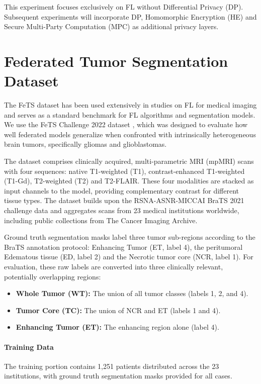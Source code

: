 \documentclass{article}
\begin{document}
This experiment focuses exclusively on FL without Differential Privacy (DP). Subsequent experiments will incorporate DP, Homomorphic Encryption (HE) and Secure Multi-Party Computation (MPC) as additional privacy layers.

\section{Federated Tumor Segmentation Dataset}
The FeTS dataset \cite{pati_federated_2025} has been used extensively in studies on FL for medical imaging \cite{reina_openfl_2022, khan_adaptive_2022, luo_influence_2023, nalawade_federated_2022} and serves as a standard benchmark for FL algorithms and segmentation models. We use the FeTS Challenge 2022 dataset \cite{spyridon_bakas_2022_6622476}, which was designed to evaluate how well federated models generalize when confronted with intrinsically heterogeneous brain tumors, specifically gliomas and glioblastomas.

The dataset comprises clinically acquired, multi-parametric MRI (mpMRI) scans with four sequences: native T1-weighted (T1), contrast-enhanced T1-weighted (T1-Gd), T2-weighted (T2) and T2-FLAIR. These four modalities are stacked as input channels to the model, providing complementary contrast for different tissue types. The dataset builds upon the RSNA-ASNR-MICCAI BraTS 2021 challenge data \cite{baid2023brats2021dataset} and aggregates scans from 23 medical institutions worldwide, including public collections from The Cancer Imaging Archive.

Ground truth segmentation masks label three tumor sub-regions according to the BraTS annotation protocol: Enhancing Tumor (ET, label 4), the peritumoral Edematous tissue (ED, label 2) and the Necrotic tumor core (NCR, label 1). For evaluation, these raw labels are converted into three clinically relevant, potentially overlapping regions:
\begin{itemize}
    \item \textbf{Whole Tumor (WT):} The union of all tumor classes (labels 1, 2, and 4).
    \item \textbf{Tumor Core (TC):} The union of NCR and ET (labels 1 and 4).
    \item \textbf{Enhancing Tumor (ET):} The enhancing region alone (label 4).
\end{itemize}

\paragraph{Training Data} The training portion contains 1,251 patients distributed across the 23 institutions, with ground truth segmentation masks provided for all cases.
\end{document}
